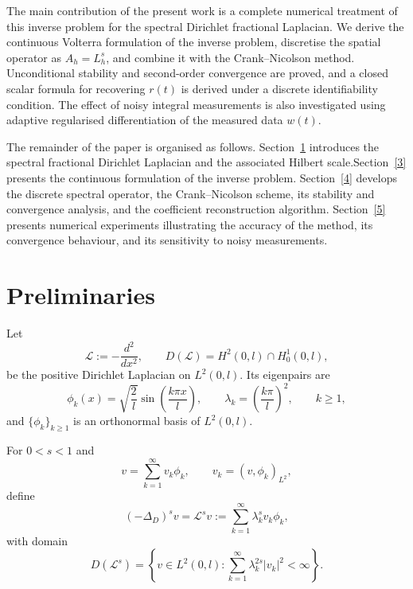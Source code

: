 \documentclass[reqno]{amsart}
\newcommand{\Lcal}{\mathcal L}
\begin{document}
The main contribution of the present work is a complete numerical treatment of this inverse problem for the spectral Dirichlet fractional Laplacian. We derive the continuous Volterra formulation of the inverse problem,
discretise the spatial operator as $A_h=L_h^s$, and combine it with the
Crank--Nicolson method.  Unconditional stability and second-order convergence are proved, and a closed scalar formula for recovering $r(t)$ is derived under a discrete identifiability condition. The effect of noisy integral measurements is also investigated using adaptive regularised differentiation of the measured data $w(t)$.

The remainder of the paper is organised as follows. Section~\ref{2}
introduces the spectral fractional Dirichlet Laplacian and the associated
Hilbert scale.Section~\ref{3} presents the continuous formulation of the inverse problem.  Section~\ref{4}
develops the discrete spectral operator, the Crank--Nicolson scheme, its
stability and convergence analysis, and the coefficient reconstruction
algorithm. Section~\ref{5} presents numerical experiments illustrating the
accuracy of the method, its convergence behaviour, and its sensitivity to
noisy measurements.

\section{Preliminaries}\label{2}
Let
\[
 \Lcal:=-\frac{d^2}{dx^2},\qquad
 D(\Lcal)=H^2(0,l)\cap H_0^1(0,l),
\]
be the positive Dirichlet Laplacian on $L^2(0,l)$. Its eigenpairs are
\begin{equation}\label{eq:eigenpairs}
 \phi_k(x)=\sqrt{\frac{2}{l}}\sin\!\left(\frac{k\pi x}{l}\right),
 \qquad
 \lambda_k=\left(\frac{k\pi}{l}\right)^2,
 \qquad k\ge1,
\end{equation}
and $\{\phi_k\}_{k\ge1}$ is an orthonormal basis of $L^2(0,l)$.

\begin{definition}\label{def:spectral-lap}
For $0<s<1$ and
\[
 v=\sum_{k=1}^{\infty}v_k\phi_k,
 \qquad v_k=(v,\phi_k)_{L^2},
\]
define
\begin{equation}\label{eq:spectral-def}
 ( -\Delta_D)^s v=\Lcal^s v
 :=\sum_{k=1}^{\infty}\lambda_k^s v_k\phi_k,
\end{equation}
with domain
\begin{equation}\label{eq:domain-spectral}
 D(\Lcal^s)
 =\left\{v\in L^2(0,l):
 \sum_{k=1}^{\infty}\lambda_k^{2s}|v_k|^2<\infty\right\}.
\end{equation}
\end{definition}
\end{document}
